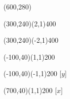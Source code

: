 \documentclass[12pt]{article}
\begin{document}
\begin{figure}[htb]
\hspace*{\fill}
\begin{egame}(600,280)

\renewcommand{\egarrowstyle}{}

%
\putbranch(300,240)(2,1){400}

\renewcommand{\egarrowstyle}{}

\putbranch(300,240)(-2,1){400}

\renewcommand{\egarrowstyle}{}

\putbranch(-100,40)(1,1){200}

\renewcommand{\egarrowstyle}{}

\putbranch(-100,40)(-1,1){200}
[$y$]

\renewcommand{\egarrowstyle}{}

\putbranch(700,40)(1,1){200}
[$x$]

\renewcommand{\egarrowstyle}{}


\end{egame}
\end{figure}
\end{document}
